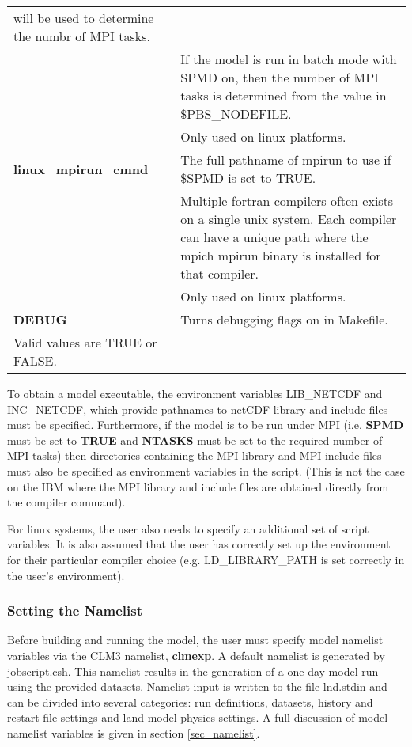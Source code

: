 \begin{longtable}{|p{1.5in}|p{4.5in}|}
                              will be used to determine the numbr of MPI tasks. \\
                            & If the model is run in batch mode with SPMD on, then the number of MPI tasks
                              is determined from the value in \$PBS\_NODEFILE. \\ \hline
                            & Only used on linux platforms. \\ \hline
{\bf linux\_mpirun\_cmnd}   & The full pathname of mpirun to use if \$SPMD is set to TRUE. \\
                            & Multiple fortran compilers often exists on a single unix system.
                              Each compiler can have a unique path where the mpich mpirun binary is
                              installed for that compiler. \\ 
                            & Only used on linux platforms. \\ \hline
{\bf DEBUG}          &   Turns debugging flags on in Makefile. \\
                         Valid values are TRUE or FALSE. \\ \hline
\end{longtable}
\bigskip

To obtain a model executable, the environment variables LIB\_NETCDF
and INC\_NETCDF, which provide pathnames to netCDF library and include
files must be specified. Furthermore, if the model is to be run under
MPI (i.e. {\bf SPMD} must be set to {\bf TRUE} and {\bf NTASKS} must
be set to the required number of MPI tasks) then directories
containing the MPI library and MPI include files must also be
specified as environment variables in the script. (This is not the
case on the IBM where the MPI library and include files are obtained
directly from the compiler command). 

For linux systems, the user also needs to specify an additional set of
script variables. It is also assumed that the user has correctly set
up the environment for their particular compiler choice
(e.g. LD\_LIBRARY\_PATH is set correctly in the user's environment).

\subsubsection {Setting the Namelist}
\label{subsubsec_namelist}

Before building and running the model, the user must specify model
namelist variables via the CLM3 namelist, {\bf clmexp}.  A default namelist
is generated by jobscript.csh. This namelist results in the generation
of a one day model run using the provided datasets.  Namelist input is
written to the file lnd.stdin and can be divided into several
categories: run definitions, datasets, history and restart file
settings and land model physics settings. A full discussion of model
namelist variables is given in section \ref{sec_namelist}.

